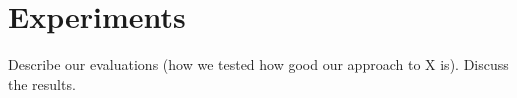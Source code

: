\section{Experiments}
Describe our evaluations (how we tested how good our approach to X is). Discuss the results.
